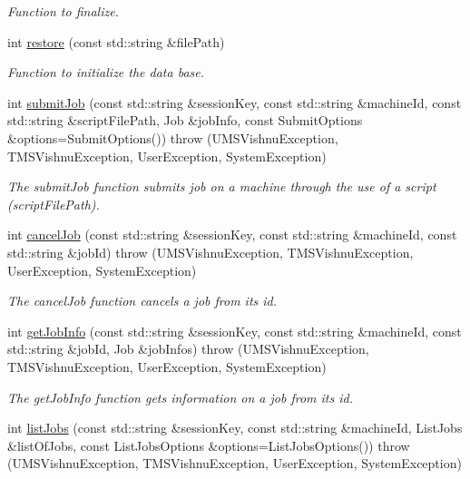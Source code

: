 \begin{DoxyCompactItemize}
\begin{DoxyCompactList}\small\item\em Function to finalize. \item\end{DoxyCompactList}\item 
int \hyperlink{namespacevishnu_ab1b9efc3bdb39619f591a2eaa96baac9}{restore} (const std::string \&filePath)
\begin{DoxyCompactList}\small\item\em Function to initialize the data base. \item\end{DoxyCompactList}\item 
int \hyperlink{namespacevishnu_acee6838fcf107a7a9b2f058159b7b9be}{submitJob} (const std::string \&sessionKey, const std::string \&machineId, const std::string \&scriptFilePath, Job \&jobInfo, const SubmitOptions \&options=SubmitOptions())  throw (UMSVishnuException, TMSVishnuException, UserException, SystemException)
\begin{DoxyCompactList}\small\item\em The submitJob function submits job on a machine through the use of a script (scriptFilePath). \item\end{DoxyCompactList}\item 
int \hyperlink{namespacevishnu_a151ba595af88d89107ff08ad0e2c5e31}{cancelJob} (const std::string \&sessionKey, const std::string \&machineId, const std::string \&jobId)  throw (UMSVishnuException, TMSVishnuException, UserException, SystemException)
\begin{DoxyCompactList}\small\item\em The cancelJob function cancels a job from its id. \item\end{DoxyCompactList}\item 
int \hyperlink{namespacevishnu_a4461c3e9d86e9c507436655056a1b660}{getJobInfo} (const std::string \&sessionKey, const std::string \&machineId, const std::string \&jobId, Job \&jobInfos)  throw (UMSVishnuException, TMSVishnuException, UserException, SystemException)
\begin{DoxyCompactList}\small\item\em The getJobInfo function gets information on a job from its id. \item\end{DoxyCompactList}\item 
int \hyperlink{namespacevishnu_a8e73e05d9006bd3e0388234ccf861538}{listJobs} (const std::string \&sessionKey, const std::string \&machineId, ListJobs \&listOfJobs, const ListJobsOptions \&options=ListJobsOptions())  throw (UMSVishnuException, TMSVishnuException, UserException, SystemException)

\end{DoxyCompactItemize}
